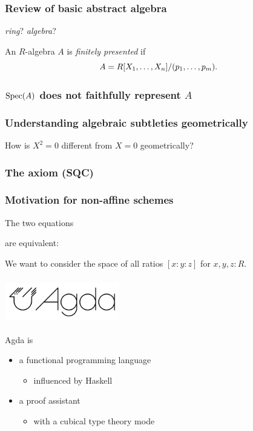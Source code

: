 \documentclass[aspectratio=1610]{beamer}
\begin{document}
\begin{frame}
  \frametitle{Review of basic abstract algebra}

  \emph{ring}?
  \emph{algebra}?

  An $R$-algebra $A$ is \emph{finitely presented} if
  \[ A = R[X_1, \dots, X_n]/(p_1, \dots, p_m) \rlap{.}\]
\end{frame}

\begin{frame}
  \frametitle{$\operatorname{Spec}(A)$ does not faithfully represent $A$}
\end{frame}

\begin{frame}
  \frametitle{Understanding algebraic subtleties geometrically}

  How is $X^2 = 0$ different from $X = 0$ geometrically?
\end{frame}

\begin{frame}
  \frametitle{The axiom (SQC)}
\end{frame}

\begin{frame}
  \frametitle{Motivation for non-affine schemes}

  \begin{example}
    The two equations

    are equivalent:
  \end{example}

  We want to consider the space of all \alert{ratios} $[x : y : z]$
  for $x, y, z : R$.
\end{frame}

\begin{frame}
  \frametitle{\includegraphics[width=5cm]{./images/agda-logo.png}}

  Agda is
  \begin{itemize}
    \item
      a functional programming language
      \begin{itemize}
        \item
          influenced by Haskell
      \end{itemize}
    \item
      a proof assistant
      \begin{itemize}
        \item
          with a \alert{cubical type theory} mode
      \end{itemize}
  \end{itemize}
\end{frame}
\end{document}
